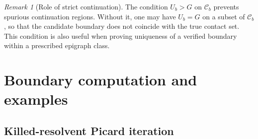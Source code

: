 \documentclass[pdflatex,sn-mathphys-num]{sn-jnl}
\theoremstyle{plain}
\theoremstyle{definition}
\theoremstyle{remark}
\newtheorem{remark}[theorem]{Remark}
\numberwithin{equation}{section}
\begin{document}
\begin{remark}[Role of strict continuation] \label{rem:strict-continuation} 
The condition \(U_b>G\) on \(\mathcal C_b\) prevents spurious continuation regions. Without it, one may have \(U_b=G\) on a subset of \(\mathcal C_b\), so that the candidate boundary does not coincide with the true contact set. This condition is also useful when proving uniqueness of a verified boundary within a prescribed epigraph class. 
\end{remark}  

\section{Boundary computation and examples} \label{sec:computation}  

\subsection{Killed-resolvent Picard iteration} \label{subsec:picard-killed-resolvent} 
\end{document}

